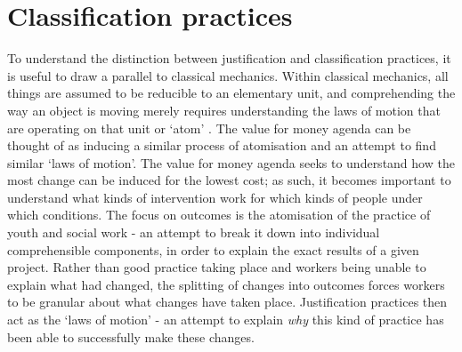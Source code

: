\section{Classification practices}
\label{sec:6-6-classification-practices}
To understand the distinction between justification and classification practices, it is useful to draw a parallel to classical mechanics. Within classical mechanics, all things are assumed to be reducible to an elementary unit, and comprehending the way an object is moving merely requires understanding the laws of motion that are operating on that unit or `atom' \citep{capra_web_1996}. The value for money agenda can be thought of as inducing a similar process of atomisation and an attempt to find similar `laws of motion'. The value for money agenda seeks to understand how the most change can be induced for the lowest cost; as such, it becomes important to understand what kinds of intervention work for which kinds of people under which conditions. The focus on outcomes is the atomisation of the practice of youth and social work - an attempt to break it down into individual comprehensible components, in order to explain the exact results of a given project. Rather than good practice taking place and workers being unable to explain what had changed, the splitting of changes into outcomes forces workers to be granular about what changes have taken place. Justification practices then act as the `laws of motion' - an attempt to explain \emph{why} this kind of practice has been able to successfully make these changes. 

